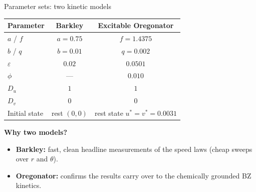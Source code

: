 \documentclass[aspectratio=169,11pt]{beamer}
\begin{document}
\begin{frame}{Parameter sets: two kinetic models}

\begin{table}
\centering
\small
\begin{tabular}{lcc}
\toprule
\textbf{Parameter} & \textbf{Barkley} & \textbf{Excitable Oregonator} \\
\midrule
$a$ / $f$      & $a = 0.75$        & $f = 1.4375$ \\
$b$ / $q$      & $b = 0.01$        & $q = 0.002$ \\
$\varepsilon$  & $0.02$            & $0.0501$ \\
$\phi$         & ---               & $0.010$ \\
$D_u$          & $1$               & $1$ \\
$D_v$          & $0$               & $0$ \\
Initial state  & rest $(0,0)$      & rest state $u^* = v^* = 0.0031$ \\
\bottomrule
\end{tabular}
\end{table}

\vspace{0.3cm}
\textbf{Why two models?}
\begin{itemize}
    \item \textbf{Barkley:} fast, clean headline measurements of the speed laws (cheap sweeps over $r$ and $\theta$).
    \item \textbf{Oregonator:} confirms the results carry over to the chemically grounded BZ kinetics.
\end{itemize}

\end{frame}
\end{document}
